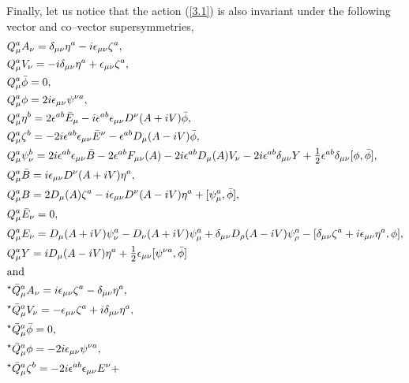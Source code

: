\documentclass[a4paper,11pt]{article}
\begin{document}
Finally, let us notice that the action (\ref{3.1}) is also invariant
under the following vector and co--vector supersymmetries,
\begin{align}
\label{3.6}
&Q_\mu^a A_\nu = \delta_{\mu\nu} \eta^a - i \epsilon_{\mu\nu} \zeta^a,
\nonumber
\\
&Q_\mu^a V_\nu = - i \delta_{\mu\nu} \eta^a + \epsilon_{\mu\nu} \zeta^a,
\nonumber
\\
&Q_\mu^a \bar{\phi} = 0,
\nonumber
\\
&Q_\mu^a \phi = 2 i \epsilon_{\mu\nu} \psi^{\nu a},
\nonumber
\\
&Q_\mu^a \eta^b = 2 \epsilon^{ab} \bar{E}_\mu -
i \epsilon^{ab} \epsilon_{\mu\nu} D^\nu(A + i V) \bar{\phi},
\nonumber
\\
&Q_\mu^a \zeta^b = - 2 i \epsilon^{ab} \epsilon_{\mu\nu} \bar{E}^\nu - 
\epsilon^{ab} D_\mu(A - i V) \bar{\phi},
\nonumber
\\
&Q_\mu^a \psi_\nu^b = 2 i \epsilon^{ab} \epsilon_{\mu\nu} \bar{B} - 
2 \epsilon^{ab} F_{\mu\nu}(A) -  2 i \epsilon^{ab} D_\mu(A) V_\nu -
2 i \epsilon^{ab} \delta_{\mu\nu} Y +
\hbox{\large$\frac{1}{2}$} \epsilon^{ab} \delta_{\mu\nu} [ \phi, \bar{\phi} ],
\nonumber
\\
&Q_\mu^a \bar{B} = i \epsilon_{\mu\nu} D^\nu(A + i V) \eta^a,
\nonumber
\\
&Q_\mu^a B = 2 D_\mu(A) \zeta^a -
i \epsilon_{\mu\nu} D^\nu(A - i V) \eta^a + [ \psi_\mu^a, \bar{\phi} ],
\nonumber
\\
&Q_\mu^a \bar{E}_\nu = 0,
\nonumber
\\
&Q_\mu^a E_\nu = D_\mu(A + i V) \psi_\nu^a - D_\nu(A + i V) \psi_\mu^a +
\delta_{\mu\nu} D_\rho(A - i V) \psi_\rho^a -
[ \delta_{\mu\nu} \zeta^a + i \epsilon_{\mu\nu} \eta^a, \phi ],
\nonumber
\\
&Q_\mu^a Y = i D_\mu(A - i V) \eta^a +
\hbox{\large$\frac{1}{2}$} \epsilon_{\mu\nu} [ \psi^{\nu a}, \bar{\phi} ]
\\
\intertext{and}
\label{3.7}
&^\star \bar{Q}_\mu^a A_\nu = i \epsilon_{\mu\nu} \zeta^a - 
\delta_{\mu\nu} \eta^a,
\nonumber
\\
&^\star \bar{Q}_\mu^a V_\nu = - \epsilon_{\mu\nu} \zeta^a + 
i \delta_{\mu\nu} \eta^a,
\nonumber
\\
&^\star \bar{Q}_\mu^a \bar{\phi} = 0,
\nonumber
\\
&^\star \bar{Q}_\mu^a \phi = - 2 i \epsilon_{\mu\nu} \psi^{\nu a},
\nonumber
\\
&^\star \bar{Q}_\mu^a \zeta^b = - 2 i \epsilon^{ab} \epsilon_{\mu\nu} E^\nu +

\end{align}
\end{document}

